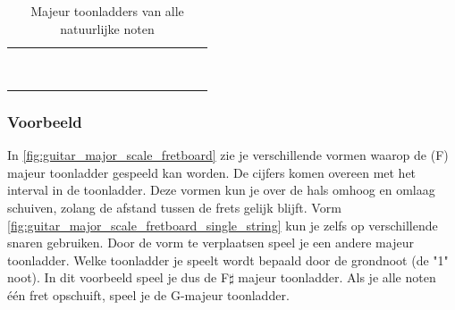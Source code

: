 \begin{table}[h]
	\centering
	\begin{NiceTabular}{*{16}{P{0.05mm}}}
		\Block{}{} &  & &  & &  & &  & &  & &  & &  & & \Block{}{} \\
		 & &  & &  & &  & &  & &  & &  & &  & \\
		 & &  & &  & &  & &  & &  & &  & &  & \\
		 & &  & &  & &  & &  & &  & &  & &  & \\
		 & &  & &  & &  & &  & &  & &  & &  & \\
		 & &  & &  & &  & &  & &  & &  & &  & \\
		 & &  & &  & &  & &  & &  & &  & &  & \\
		 & &  & &  & &  & &  & &  & &  & &  & \\
		 & &  & &  & &  & &  & &  & &  & &  & 
	\end{NiceTabular}
	\caption{Majeur toonladders van alle natuurlijke noten}
	\label{tab:guitar_natural_note_major_scale}
\end{table}

\newpage

\subsubsection{Voorbeeld}

In \autoref{fig:guitar_major_scale_fretboard} zie je verschillende vormen waarop de (F\sharp) majeur toonladder gespeeld kan worden. De cijfers komen overeen met het interval in de toonladder. Deze vormen kun je over de hals omhoog en omlaag schuiven, zolang de afstand tussen de frets gelijk blijft. Vorm \autoref{fig:guitar_major_scale_fretboard_single_string} kun je zelfs op verschillende snaren gebruiken. Door de vorm te verplaatsen speel je een andere majeur toonladder. Welke toonladder je speelt wordt bepaald door de grondnoot (de "1" noot). In dit voorbeeld speel je dus de F$\sharp$ majeur toonladder. Als je alle noten één fret opschuift, speel je de G-majeur toonladder.

